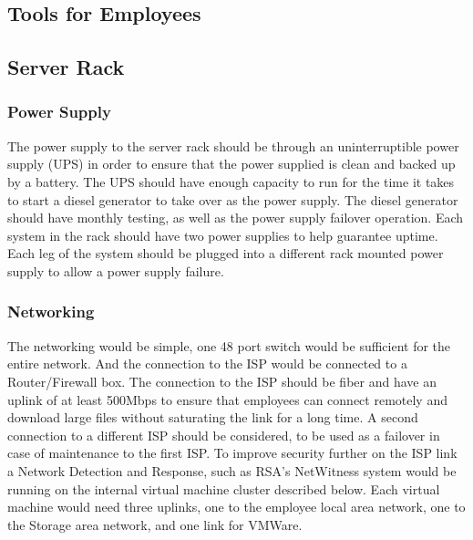 \documentclass{article}
\begin{document}
\subsection{Tools for Employees} 
\subsection{Server Rack}
\subsubsection{Power Supply} The power supply to the server rack should be through an uninterruptible power supply (UPS) in order to ensure that the power supplied is clean and backed up by a battery. The UPS should have enough capacity to run for the time it takes to start a diesel generator to take over as the power supply. The diesel generator should have monthly testing, as well as the power supply failover operation. Each system in the rack should have two power supplies to help guarantee uptime. Each leg of the system should be plugged into a different rack mounted power supply to allow a power supply failure. 
\subsubsection{Networking} The networking would be simple, one 48 port switch would be sufficient for the entire network. And the connection to the ISP would be connected to a Router/Firewall box. The connection to the ISP should be fiber and have an uplink of at least 500Mbps to ensure that employees can connect remotely and download large files without saturating the link for a long time. A second connection to a different ISP should be considered, to be used as a failover in case of maintenance to the first ISP. To improve security further on the ISP link a Network Detection and Response, such as RSA's NetWitness system would be running on the internal virtual machine cluster described below. Each virtual machine would need three uplinks, one to the employee local area network, one to the Storage area network, and one link for VMWare. 
\end{document}
